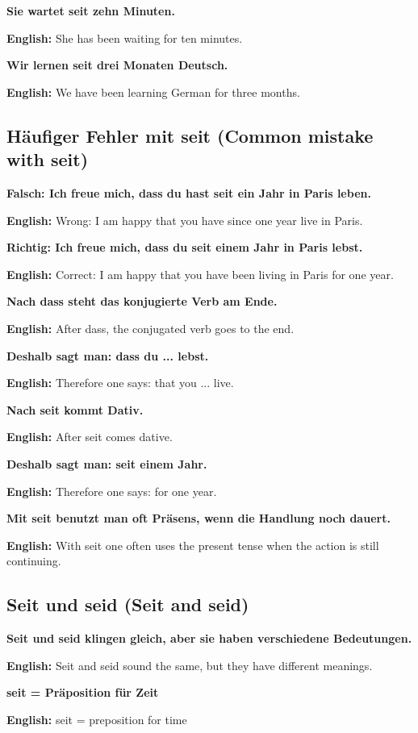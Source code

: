 \documentclass[a4paper,11pt]{article}
\newcommand{\EnglishText}[1]{{\small\color{SoftGray}\textbf{English: }#1\par}}
\newcommand{\EN}[1]{\EnglishText{#1}}
\begin{document}
            \textbf{Sie wartet seit zehn Minuten.}
            \EN{She has been waiting for ten minutes.}
            
            \textbf{Wir lernen seit drei Monaten Deutsch.}
            \EN{We have been learning German for three months.}
        
        \subsection{Häufiger Fehler mit seit \textnormal{(Common mistake with seit)}}
            
            \textbf{Falsch: Ich freue mich, dass du hast seit ein Jahr in Paris leben.}
            \EN{Wrong: I am happy that you have since one year live in Paris.}
            
            \textbf{Richtig: Ich freue mich, dass du seit einem Jahr in Paris lebst.}
            \EN{Correct: I am happy that you have been living in Paris for one year.}
            
            \textbf{Nach dass steht das konjugierte Verb am Ende.}
            \EN{After dass, the conjugated verb goes to the end.}
            
            \textbf{Deshalb sagt man: dass du ... lebst.}
            \EN{Therefore one says: that you ... live.}
            
            \textbf{Nach seit kommt Dativ.}
            \EN{After seit comes dative.}
            
            \textbf{Deshalb sagt man: seit einem Jahr.}
            \EN{Therefore one says: for one year.}
            
            \textbf{Mit seit benutzt man oft Präsens, wenn die Handlung noch dauert.}
            \EN{With seit one often uses the present tense when the action is still continuing.}
        
        \subsection{Seit und seid \textnormal{(Seit and seid)}}
            
            \textbf{Seit und seid klingen gleich, aber sie haben verschiedene Bedeutungen.}
            \EN{Seit and seid sound the same, but they have different meanings.}
            
            \textbf{seit = Präposition für Zeit}
            \EN{seit = preposition for time}
            
\end{document}
